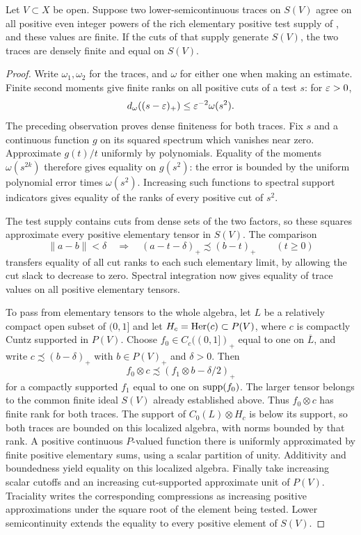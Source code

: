 \begin{lemma}\label{cc:finite-trace-determination}
Let $V\subset X$ be open.  Suppose two lower-semicontinuous
traces on $S(V)$ agree on all positive even integer powers of the rich
elementary positive test supply of , and
these values are finite.  If the cuts of that supply generate
$S(V)$, the two traces are densely finite and equal on $S(V)$.
\end{lemma}

\begin{proof}
Write $\omega_1,\omega_2$ for the traces, and $\omega$ for
either one when making an estimate.
Finite second moments give finite ranks on all positive cuts
of a test $s$: for $\varepsilon>0$,
\[
 d_\omega((s-\varepsilon)_+)\le\varepsilon^{-2}\omega(s^2).
\]
The preceding observation proves dense finiteness for both
traces.  Fix $s$ and a continuous function $g$ on its squared
spectrum which vanishes near zero.  Approximate $g(t)/t$
uniformly by polynomials.  Equality of the moments
$\omega(s^{2k})$ therefore gives equality on $g(s^2)$:
the error is bounded by the uniform polynomial error times
$\omega(s^2)$.  Increasing such functions to spectral support
indicators gives equality of the ranks of every positive cut
of $s^2$.

The test supply contains cuts from dense sets of the two
factors, so these squares approximate every positive
elementary tensor in $S(V)$.  The comparison
\[
 \|a-b\|<\delta
 \quad\Longrightarrow\quad
 (a-t-\delta)_+\precsim(b-t)_+
 \qquad(t\ge0)
\]
transfers equality of all cut ranks to each such elementary
limit, by allowing the cut slack to decrease to zero.  Spectral
integration now gives equality of trace values on all positive
elementary tensors.

To pass from elementary tensors to the whole algebra, let $L$ be a
relatively compact open subset of $(0,1]$ and let
$H_c=\operatorname{Her}(c)\subset P(V)$, where $c$ is compactly Cuntz supported
in $P(V)$.  Choose $f_0\in C_c((0,1])_+$ equal to one on
$\overline L$, and write $c\precsim(b-\delta)_+$ with
$b\in P(V)_+$ and $\delta>0$.  Then
\[
 f_0\otimes c\precsim(f_1\otimes b-\delta/2)_+
\]
for a compactly supported $f_1$ equal to one on $\operatorname{supp}(f_0)$.
The larger tensor belongs to the common finite ideal $S(V)$ already
established above.  Thus $f_0\otimes c$ has finite rank for both
traces.  The support of $C_0(L)\otimes H_c$ is below its support,
so both traces are bounded on this localized algebra, with norms
bounded by that rank.  A positive continuous $P$-valued
function there is uniformly approximated by finite positive
elementary sums, using a scalar partition of unity.
Additivity and boundedness yield equality on this localized
algebra.  Finally take increasing scalar cutoffs and an
increasing cut-supported approximate unit of $P(V)$.
Traciality writes the corresponding compressions as
increasing positive approximations under the square root of
the element being tested.  Lower semicontinuity extends the
equality to every positive element of $S(V)$.
\end{proof}

